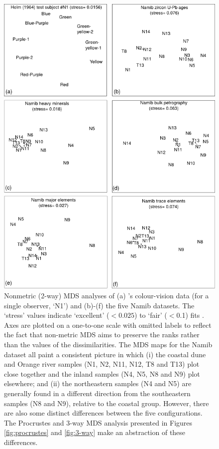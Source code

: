 \documentclass{article}
\begin{document}
\begin{figure}[!ht]
\centering
\includegraphics[height=.7\textheight]{2way3.png}
\caption{Nonmetric (2-way) MDS analyses of (a) \citet{helm1964}'s
  colour-vision data (for a single observer, `N1') and (b)-(f) the
  five Namib datasets. The `stress' values indicate `excellent'
  ($<0.025$) to `fair' ($<$0.1) fits \citep{kruskal1978,
    vermeesch2013}. Axes are plotted on a one-to-one scale with
  omitted labels to reflect the fact that non-metric MDS aims to
  preserve the ranks rather than the values of the
  dissimilarities. The MDS maps for the Namib dataset all paint a
  consistent picture in which (i) the coastal dune and Orange river
  samples (N1, N2, N11, N12, T8 and T13) plot close together and the
  inland samples (N4, N5, N8 and N9) plot elsewhere; and (ii) the
  northeastern samples (N4 and N5) are generally found in a different
  direction from the southeastern samples (N8 and N9), relative to the
  coastal group. However, there are also some distinct differences
  between the five configurations. The Procrustes and 3-way MDS
  analysis presented in Figures \ref{fig:procrustes} and
  \ref{fig:3-way} make an abstraction of these differences.}
\label{fig:2way}
\end{figure}
\end{document}
